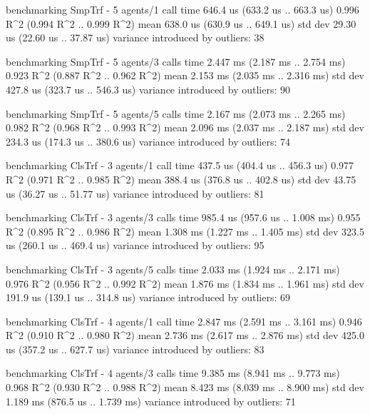\begin{showCode}
benchmarking SmpTrf - 5 agents/1 call
time                 646.4 us   (633.2 us .. 663.3 us)
                     0.996 R^2   (0.994 R^2 .. 0.999 R^2)
mean                 638.0 us   (630.9 us .. 649.1 us)
std dev              29.30 us   (22.60 us .. 37.87 us)
variance introduced by outliers: 38%

benchmarking SmpTrf - 5 agents/3 calls
time                 2.447 ms   (2.187 ms .. 2.754 ms)
                     0.923 R^2   (0.887 R^2 .. 0.962 R^2)
mean                 2.153 ms   (2.035 ms .. 2.316 ms)
std dev              427.8 us   (323.7 us .. 546.3 us)
variance introduced by outliers: 90%

benchmarking SmpTrf - 5 agents/5 calls
time                 2.167 ms   (2.073 ms .. 2.265 ms)
                     0.982 R^2   (0.968 R^2 .. 0.993 R^2)
mean                 2.096 ms   (2.037 ms .. 2.187 ms)
std dev              234.3 us   (174.3 us .. 380.6 us)
variance introduced by outliers: 74%

benchmarking ClsTrf - 3 agents/1 call
time                 437.5 us   (404.4 us .. 456.3 us)
                     0.977 R^2   (0.971 R^2 .. 0.985 R^2)
mean                 388.4 us   (376.8 us .. 402.8 us)
std dev              43.75 us   (36.27 us .. 51.77 us)
variance introduced by outliers: 81%

benchmarking ClsTrf - 3 agents/3 calls
time                 985.4 us   (957.6 us .. 1.008 ms)
                     0.955 R^2   (0.895 R^2 .. 0.986 R^2)
mean                 1.308 ms   (1.227 ms .. 1.405 ms)
std dev              323.5 us   (260.1 us .. 469.4 us)
variance introduced by outliers: 95%

benchmarking ClsTrf - 3 agents/5 calls
time                 2.033 ms   (1.924 ms .. 2.171 ms)
                     0.976 R^2   (0.956 R^2 .. 0.992 R^2)
mean                 1.876 ms   (1.834 ms .. 1.961 ms)
std dev              191.9 us   (139.1 us .. 314.8 us)
variance introduced by outliers: 69%

benchmarking ClsTrf - 4 agents/1 call
time                 2.847 ms   (2.591 ms .. 3.161 ms)
                     0.946 R^2   (0.910 R^2 .. 0.980 R^2)
mean                 2.736 ms   (2.617 ms .. 2.876 ms)
std dev              425.0 us   (357.2 us .. 627.7 us)
variance introduced by outliers: 83%

benchmarking ClsTrf - 4 agents/3 calls
time                 9.385 ms   (8.941 ms .. 9.773 ms)
                     0.968 R^2   (0.930 R^2 .. 0.988 R^2)
mean                 8.423 ms   (8.039 ms .. 8.900 ms)
std dev              1.189 ms   (876.5 us .. 1.739 ms)
variance introduced by outliers: 71%


\end{showCode}
